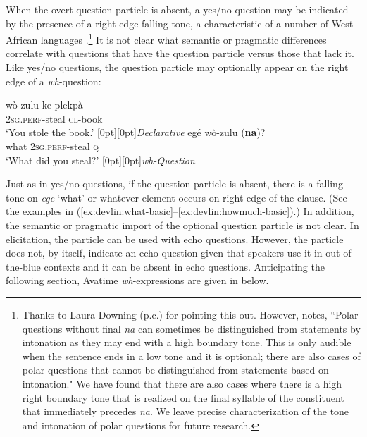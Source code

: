 \documentclass[output=paper]{langscibook}
\begin{document}
When the overt question particle is absent, a yes/no question may be indicated by the presence of a right-edge falling tone, a characteristic of a number of West African languages \citep{downing2017}.\footnote{Thanks to Laura Downing (p.c.) for pointing this out. However, \citet[62--63]{van2014information} notes, ``Polar questions without final \textit{na} can sometimes be distinguished from statements by intonation as they may end with a high boundary tone. This is only audible when the sentence ends in a low tone and it is optional; there are also cases of polar questions that cannot be distinguished from statements based on intonation." We have found that there are also cases where there is a high right boundary tone that is realized on the final syllable of the constituent that immediately precedes \textit{na}. We leave precise characterization of the tone and intonation of polar questions for future research.}  It is not clear what semantic or pragmatic differences correlate with questions that have the question particle versus those that lack it.  Like yes/no questions, the question particle may optionally appear on the right edge of a \textit{wh}-question:
\ea \label{ex:devlin:yesno-basic}
\begin{xlist}
\ex 
\gll w\`o-zulu ke-plekp\`{a} \\
\textsc{2sg.perf}-steal \textsc{cl}-book\\
\glt `You stole the book.’ \hfill \raisebox{1.2\baselineskip}[0pt][0pt]{\textit{Declarative}}
\ex
\gll eg\'{e} w\`{o}-zulu (\textbf{na})?\\
what \textsc{2sg.perf}-steal	 \textsc{q}\\
\glt `What did you steal?’ \hfill \raisebox{1.2\baselineskip}[0pt][0pt]{\textit{wh-Question}}
\end{xlist}
\z

Just as in yes/no questions, if the question particle is absent, there is a falling tone on \textit{ege} `what’ or whatever element occurs on right edge of the clause. (See the examples in (\ref{ex:devlin:what-basic}--\ref{ex:devlin:howmuch-basic}).) In addition, the semantic or pragmatic import of the optional question particle is not clear.  In elicitation, the particle can be used with echo questions.  However, the particle does not, by itself, indicate an echo question given that speakers use it in out-of-the-blue contexts and it can be absent in echo questions.
Anticipating the following section, Avatime \textit{wh}-expressions are given in  below.
\end{document}
